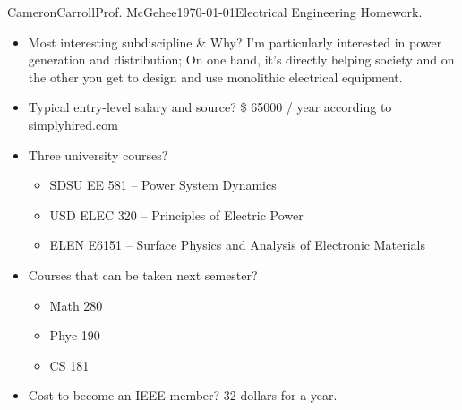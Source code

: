 \documentclass[12pt,letterpaper]{article}
\begin{document}
\begin{mla}{Cameron}{Carroll}{Prof. McGehee}{\today}{Electrical Engineering Homework.}

\begin{itemize}
\item Most interesting subdiscipline \& Why? I'm particularly interested in power generation and distribution; On one hand, it's directly helping society and on the other you get to design and use monolithic electrical equipment.
\item Typical entry-level salary and source? \$ 65000 / year according to simplyhired.com
\item Three university courses? 
\begin{itemize}
\item SDSU EE 581 -- Power System Dynamics
\item USD ELEC 320 -- Principles of Electric Power
\item ELEN E6151 -- Surface Physics and Analysis of Electronic Materials
\end{itemize}

\item Courses that can be taken next semester?
\begin{itemize}
\item Math 280
\item Phyc 190
\item CS 181
\end{itemize}
\item Cost to become an IEEE member? 32 dollars for a year.
\end{itemize}
\end{mla}
\end{document}
